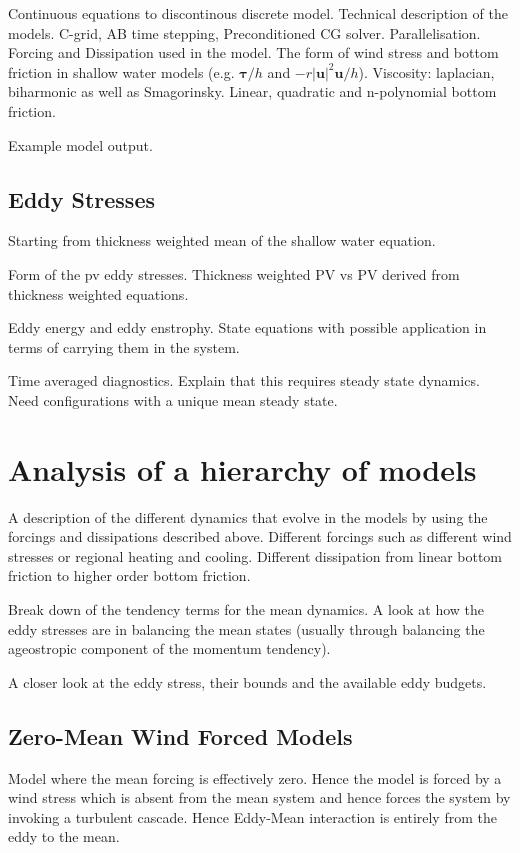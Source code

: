 \documentclass[10pt,a4paper]{article}
\begin{document}
Continuous equations to discontinous discrete model.
Technical description of the models. 
C-grid, AB time stepping, Preconditioned CG solver. 
Parallelisation.
Forcing and Dissipation used in the model.
The form of wind stress and bottom friction in
shallow water models (e.g. $\boldsymbol{\tau}/h$ and 
$-r\left|\boldsymbol{u}\right|^{2}\boldsymbol{u}/h$). Viscosity:
laplacian, biharmonic as well as Smagorinsky.
Linear, quadratic and n-polynomial bottom friction.

Example model output.

\subsection{Eddy Stresses}

Starting from thickness weighted mean of the shallow water
equation. 

Form of the pv eddy stresses.
Thickness weighted PV vs PV derived from thickness 
weighted equations.

Eddy energy and eddy enstrophy. State equations with 
possible application in terms of carrying them in the system.

Time averaged diagnostics. Explain that this 
requires steady state dynamics. Need configurations
with a unique mean steady state.

\section{Analysis of a hierarchy of models}

A description of the different dynamics that evolve
in the models by using the forcings and 
dissipations described above. Different forcings
such as different wind stresses or regional heating
and cooling. Different dissipation from
linear bottom friction to higher order bottom
friction.

Break down of the tendency terms for the mean
dynamics. A look at how the eddy stresses are 
in balancing the mean states (usually through
balancing the ageostropic component of the
momentum tendency).

A closer look at the eddy stress, their bounds 
and the available eddy budgets.

\subsection{Zero-Mean Wind Forced Models}

Model where the mean forcing is effectively zero. 
Hence the model is forced by a wind stress which is
absent from the mean system and hence forces the
system by 
invoking a turbulent cascade. Hence Eddy-Mean
interaction is entirely from the eddy to the mean.
\end{document}
